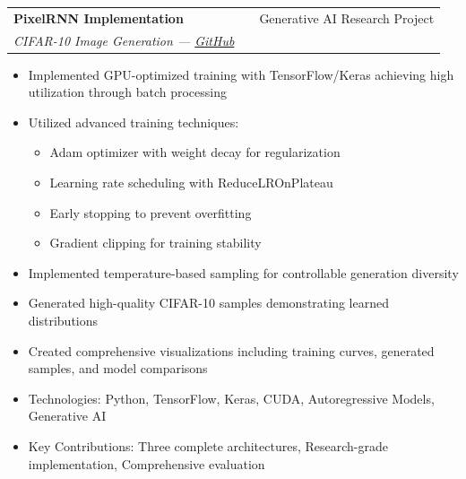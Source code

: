 \documentclass[a4paper,12pt]{article}
\makeatletter
\newenvironment{projectdetailed}[3]
    {
    \begin{tabularx}{\linewidth}{@{}l X r@{}}
    \textbf{#1} & \hfill & #2 \\
    \textit{#3} & & \\[3.75pt]
    \end{tabularx}
    \begin{minipage}[t]{\linewidth}
    \begin{itemize}[nosep,after=\strut, leftmargin=1em, itemsep=2pt,label=--]
    }
    {
    \end{itemize}
    \end{minipage}
    \vspace{6pt}
    }
\makeatother
\begin{document}
\begin{projectdetailed}{PixelRNN Implementation}{Generative AI Research Project}{CIFAR-10 Image Generation — \href{https://github.com/Umer-Farooq-CS/PixelRNN-Implementation-CIFAR10}{GitHub}}
\begin{itemize}[nosep, leftmargin=2em]
    \item Training efficiency and convergence analysis
\end{itemize}
\item Implemented GPU-optimized training with TensorFlow/Keras achieving high utilization through batch processing
\item Utilized advanced training techniques:
\begin{itemize}[nosep, leftmargin=2em]
    \item Adam optimizer with weight decay for regularization
    \item Learning rate scheduling with ReduceLROnPlateau
    \item Early stopping to prevent overfitting
    \item Gradient clipping for training stability
\end{itemize}
\item Implemented temperature-based sampling for controllable generation diversity
\item Generated high-quality CIFAR-10 samples demonstrating learned distributions
\item Created comprehensive visualizations including training curves, generated samples, and model comparisons
\item Technologies: Python, TensorFlow, Keras, CUDA, Autoregressive Models, Generative AI
\item Key Contributions: Three complete architectures, Research-grade implementation, Comprehensive evaluation
\end{projectdetailed}
\end{document}
